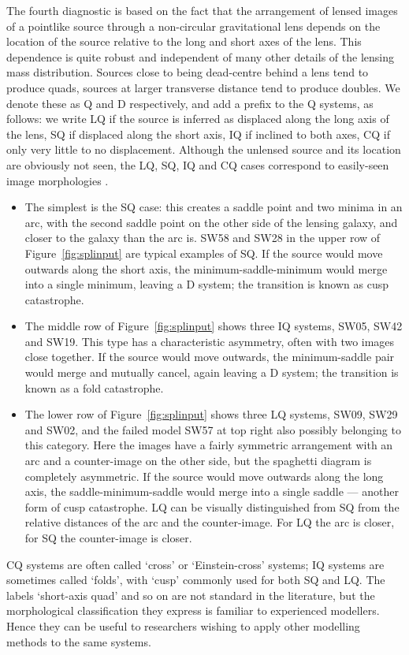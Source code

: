 The fourth diagnostic is based on the fact that the arrangement of
lensed images of a pointlike source through a non-circular
gravitational lens depends on the location of the source relative to
the long and short axes of the lens.  This dependence is quite robust
and independent of many other details of the lensing mass
distribution.  Sources close to being dead-centre behind a lens tend
to produce quads, sources at larger transverse distance tend to
produce doubles.  We denote these as Q and D respectively, and add a
prefix to the Q systems, as follows: we write LQ if the source is
inferred as displaced along the long axis of the lens, SQ if displaced
along the short axis, IQ if inclined to both axes, CQ if only very little to
no displacement.  Although the
unlensed source and its location are obviously not seen, the LQ, SQ, IQ and CQ
cases correspond to easily-seen image morphologies \citep[see,
  e.g.,][]{2003AJ....125.2769S}.
\begin{itemize}
\item The simplest is the SQ case: this creates a saddle point and two
  minima in an arc, with the second saddle point on the other side of
  the lensing galaxy, and closer to the galaxy than the arc is.  SW58
  and SW28 in the upper row of Figure~\ref{fig:splinput} are typical
  examples of SQ.  If the source would move outwards along the short
  axis, the minimum-saddle-minimum would merge into a single minimum,
  leaving a D system; the transition is known as cusp catastrophe.
\item The middle row of Figure~\ref{fig:splinput} shows three IQ
  systems, SW05, SW42 and SW19.  This type has a characteristic
  asymmetry, often with two images close together.  If the source
  would move outwards, the minimum-saddle pair would merge and
  mutually cancel, again leaving a D system; the transition is known
  as a fold catastrophe.
\item The lower row of Figure~\ref{fig:splinput} shows three LQ
  systems, SW09, SW29 and SW02, and the failed model SW57 at top right
  also possibly belonging to this category.  Here the images have a
  fairly symmetric arrangement with an arc and a counter-image on the
  other side, but the spaghetti diagram is completely asymmetric.  If
  the source would move outwards along the long axis, the
  saddle-minimum-saddle would merge into a single saddle --- another
  form of cusp catastrophe.  LQ can be visually distinguished from SQ
  from the relative distances of the arc and the counter-image.  For
  LQ the arc is closer, for SQ the counter-image is closer.
\end{itemize}
CQ systems are often called `cross' or `Einstein-cross' systems; IQ
systems are sometimes called `folds', with `cusp' commonly used for
both SQ and LQ.  The labels `short-axis quad' and so on are not
standard in the literature, but the morphological classification they
express is familiar to experienced modellers.  Hence they can be
useful to researchers wishing to apply other modelling methods to the
same systems.

